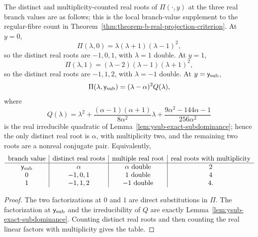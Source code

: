 \begin{proposition}\label{prop:branch-value-real-root-counts}
The distinct and multiplicity-counted real roots of \(\Pi(\cdot,y)\) at the three real branch values are as follows; this is the local branch-value supplement to the regular-fibre count in Theorem~\ref{thm:theorem-b-real-projection-criterion}.
At \(y=0\),
\[
\Pi(\lambda,0)=\lambda(\lambda+1)(\lambda-1)^2,
\]
so the distinct real roots are \(-1,0,1\), with \(\lambda=1\) double.
At \(y=1\),
\[
\Pi(\lambda,1)=(\lambda-2)(\lambda-1)(\lambda+1)^2,
\]
so the distinct real roots are \(-1,1,2\), with \(\lambda=-1\) double.
At \(y=\mathsf{y}_{\mathrm{sub}}\),
\[
\Pi(\lambda,\mathsf{y}_{\mathrm{sub}})=(\lambda-\alpha)^2 Q(\lambda),
\]
where
\[
Q(\lambda)=
\lambda^2+\frac{(\alpha-1)(\alpha+1)}{8\alpha^2}\lambda
+\frac{9\alpha^2-144\alpha-1}{256\alpha^2}
\]
is the real irreducible quadratic of Lemma~\ref{lem:ysub-exact-subdominance}; hence the only distinct real root is \(\alpha\), with multiplicity two, and the remaining two roots are a nonreal conjugate pair.
Equivalently,
\[
\begin{array}{c|c|c|c}
\text{branch value} & \text{distinct real roots} & \text{multiple real root} & \text{real roots with multiplicity}\\
\hline
\mathsf{y}_{\mathrm{sub}} & \alpha & \alpha\text{ double} & 2\\
0 & -1,0,1 & 1\text{ double} & 4\\
1 & -1,1,2 & -1\text{ double} & 4.
\end{array}
\]
\end{proposition}

\begin{proof}
The two factorizations at \(0\) and \(1\) are direct substitutions in \(\Pi\).
The factorization at \(\mathsf{y}_{\mathrm{sub}}\) and the irreducibility of \(Q\) are exactly Lemma~\ref{lem:ysub-exact-subdominance}.
Counting distinct real roots and then counting the real linear factors with multiplicity gives the table.
\end{proof}

